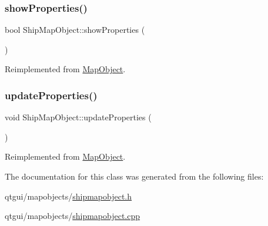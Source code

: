 \mbox{\label{class_ship_map_object_a066dd918f052af419df95d101a36c0b8}} 
\subsubsection{\texorpdfstring{showProperties()}{showProperties()}}
{\footnotesize\ttfamily bool Ship\+Map\+Object\+::show\+Properties (\begin{DoxyParamCaption}{ }\end{DoxyParamCaption})\hspace{0.3cm}{\ttfamily [virtual]}}



Reimplemented from \mbox{\hyperlink{class_map_object_ac58ccb02d5d96d934939b217020c822c}{Map\+Object}}.

\mbox{\label{class_ship_map_object_ad88a96fc3ad15c9ea919c2b6d3157fff}} 
\subsubsection{\texorpdfstring{updateProperties()}{updateProperties()}}
{\footnotesize\ttfamily void Ship\+Map\+Object\+::update\+Properties (\begin{DoxyParamCaption}{ }\end{DoxyParamCaption})\hspace{0.3cm}{\ttfamily [virtual]}}



Reimplemented from \mbox{\hyperlink{class_map_object_afa7cd6a4368f4dd077614ac1d983a6c8}{Map\+Object}}.



The documentation for this class was generated from the following files\+:\begin{DoxyCompactItemize}
\item 
qtgui/mapobjects/\mbox{\hyperlink{shipmapobject_8h}{shipmapobject.\+h}}\item 
qtgui/mapobjects/\mbox{\hyperlink{shipmapobject_8cpp}{shipmapobject.\+cpp}}\end{DoxyCompactItemize}
